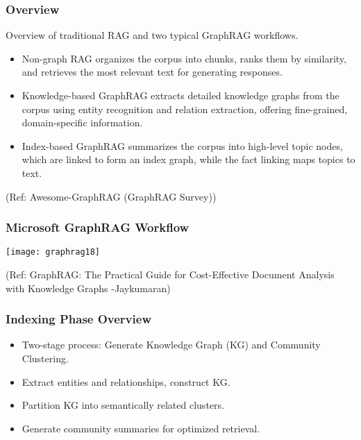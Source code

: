 \begin{frame}[fragile]\frametitle{Overview}

Overview of traditional RAG and two typical GraphRAG workflows.

    \begin{itemize}
        \item Non-graph RAG organizes the corpus into chunks, ranks them by similarity, and retrieves the most relevant text for generating responses.
        \item Knowledge-based GraphRAG extracts detailed knowledge graphs from the corpus using entity recognition and relation extraction, offering fine-grained, domain-specific information.
        \item Index-based GraphRAG summarizes the corpus into high-level topic nodes, which are linked to form an index graph, while the fact linking maps topics to text.
    \end{itemize}
	
	{\tiny (Ref: Awesome-GraphRAG (GraphRAG Survey))}
	
\end{frame}

\begin{frame}[fragile]\frametitle{Microsoft GraphRAG Workflow}

	
	\begin{center}
	\texttt{[image: graphrag18]}
	
	{\tiny (Ref: GraphRAG: The Practical Guide for Cost-Effective Document Analysis with Knowledge Graphs -Jaykumaran)}
	\end{center}	
\end{frame}

\begin{frame}[fragile]\frametitle{Indexing Phase Overview}
    \begin{itemize}
        \item Two-stage process: Generate Knowledge Graph (KG) and Community Clustering.
        \item Extract entities and relationships, construct KG.
        \item Partition KG into semantically related clusters.
        \item Generate community summaries for optimized retrieval.
    \end{itemize}
\end{frame}

